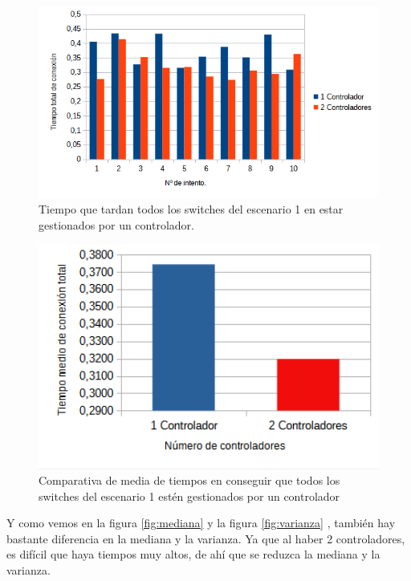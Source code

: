 \documentclass[a4paper, 12pt]{book}
\begin{document}
 	\begin{figure}[H]
 		\centering
 		\includegraphics[width=16cm, keepaspectratio]{img/comparativabucle4}
 		\caption{Tiempo que tardan todos los switches del escenario 1 en estar gestionados por un controlador.}
 		\label{figura:comparativabucle4}
 	\end{figure}
 	
 	\begin{figure}[H]
 		\centering
 		\includegraphics[width=12cm, keepaspectratio]{img/comparativamediasbucle}
 		\caption{Comparativa de media de tiempos en conseguir que todos los switches del escenario 1 estén gestionados por un controlador}
 		\label{figura:mediabucle4}
 	\end{figure}
 	
 	Y como vemos en la figura \ref{fig:mediana} y la figura \ref{fig:varianza} , también hay bastante diferencia en la mediana y la varianza. Ya que al haber 2 controladores, es difícil que haya tiempos muy altos, de ahí que se reduzca la mediana y la varianza.
\end{document}
